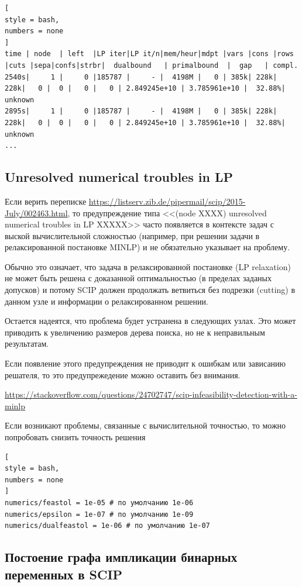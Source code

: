 \documentclass[%
	11pt,
	a4paper,
	utf8,
		]{article}
\begin{document}
\begin{lstlisting}[
style = bash,
numbers = none
]
time | node  | left  |LP iter|LP it/n|mem/heur|mdpt |vars |cons |rows |cuts |sepa|confs|strbr|  dualbound   | primalbound  |  gap   | compl. 
2540s|     1 |     0 |185787 |     - |  4198M |   0 | 385k| 228k| 228k|   0 |  0 |   0 |   0 | 2.849245e+10 | 3.785961e+10 |  32.88%| unknown
2895s|     1 |     0 |185787 |     - |  4198M |   0 | 385k| 228k| 228k|   0 |  0 |   0 |   0 | 2.849245e+10 | 3.785961e+10 |  32.88%| unknown
...
\end{lstlisting}


\subsection{Unresolved numerical troubles in LP}

Если верить переписке \url{https://listserv.zib.de/pipermail/scip/2015-July/002463.html}, то предупреждение типа <<(node XXXX) unresolved numerical troubles in LP XXXXX>> часто появляется в контексте задач с выской вычислительной сложностью (например, при решении задачи в релаксированной постановке MINLP) и не обязательно указывает на проблему.

Обычно это означает, что задача в релаксированной постановке (LP relaxation) не может быть решена с доказанной оптимальностью (в пределах заданых допусков) и потому SCIP должен продолжать ветвиться без подрезки (cutting) в данном узле и информации о релаксированном решении.

Остается надеятся, что проблема будет устранена в следующих узлах. Это может приводить к увеличению размеров дерева поиска, но не к неправильным результатам.

Если появление этого предупреждения не приводит к ошибкам или зависанию решателя, то это предупрежедение можно оставить без внимания.

\noindent\url{https://stackoverflow.com/questions/24702747/scip-infeasibility-detection-with-a-minlp}

Если возникают проблемы, связанные с вычислительной точностью, то можно попробовать снизить точность решения
\begin{lstlisting}[
style = bash,
numbers = none
]
numerics/feastol = 1e-05 # по умолчанию 1e-06
numerics/epsilon = 1e-07 # по умолчанию 1e-09
numerics/dualfeastol = 1e-06 # по умолчанию 1e-07
\end{lstlisting}

\subsection{Постоение графа импликации бинарных переменных в SCIP}
\end{document}
